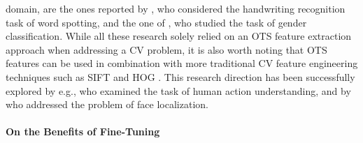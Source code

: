 domain, are the ones reported by \citet{sharma2015adapting}, who considered the handwriting recognition task of word spotting, and the one of \citet{van2015deep}, who studied the task of gender classification. While all these research solely relied on an OTS feature extraction approach when addressing a CV problem, it is also worth noting that OTS features can be used in combination with more traditional CV feature engineering techniques such as SIFT \cite{lowe2004distinctive} and HOG \cite{dalal2005histograms}. This research direction has been successfully explored by e.g., \citet{wang2014action} who examined the task of human action understanding, and by \citet{zhong2016face} who addressed the problem of face localization.


\paragraph{On the Benefits of Fine-Tuning}
